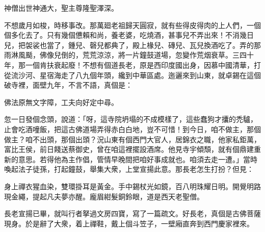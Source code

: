 \begin{myquote}
神僧出世神通大，聖主尊隆聖澤深。
\end{myquote}

不想歲月如梭，時移事改。那萬廻老祖歸天圓寂，就有些得皮得肉的上人們，一個個多化去了。只有幾個憊賴和尚，養老婆，吃燒酒，{}甚事兒不弄出來！不消幾日兒，把袈裟也當了，鍾兒、磬兒都典了，殿上椽兒、磚兒、瓦兒換酒吃了。弄的那雨淋風颳，佛像兒倒的，荒荒涼涼，將一片鐘鼓道場，忽變作荒烟衰草。三四十年，那一個肯扶衰起廢！不想有個道長老，原是西印度國出身，因慕中國清華，打從流沙河、星宿海走了八九個年頭，纔到中華區處。迤邐來到山東，就卓錫在這個破寺裡，面壁九年，不言不語，{}真個是：

\begin{myquote}
佛法原無文字障，工夫向好定中尋。
\end{myquote}

忽一日發個念頭，說道：「呀，這寺院坍塌的不成模樣了，這些蠢狗才攮的禿驢，止會吃酒噇飯，把這古佛道場弄得赤白白地，豈不可惜！到今日，咱不做主，那個做主？咱不出頭，那個出頭？況山東有個西門大官人，居錦衣之職，他家私鉅萬，富比王侯，前日餞送蔡御史，曾在咱這裡擺設酒席。他見寺宇傾頹，就有個鼎建重新的意思。若得他為主作倡，管情早晚間把咱好事成就也。咱須去走一遭。」當時喚起法子徒孫，打起鐘鼓，舉集大衆，上堂宣揚此意。那長老怎生打扮？但見：

\begin{myquote}
身上禪衣猩血染，雙環掛耳是黃金。手中錫杖光如鏡，百八明珠耀日明。開覺明路現金繩，提起凡夫夢亦醒。龐眉紺髮銅鈴眼，道是西天老聖僧。
\end{myquote}

長老宣揚已畢，就叫行者拏過文房四寶，寫了一篇疏文。好長老，真個是古佛菩薩現身。於是辭了大衆，着上禪鞋，戴上個斗笠子，一壁廂直奔到西門慶家裡來。

